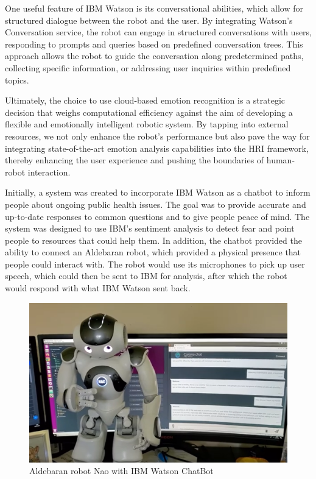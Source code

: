 One useful feature of IBM Watson is its conversational abilities, which allow for structured dialogue between the robot and the user. By integrating Watson's Conversation service, the robot can engage in structured conversations with users, responding to prompts and queries based on predefined conversation trees. This approach allows the robot to guide the conversation along predetermined paths, collecting specific information, or addressing user inquiries within predefined topics.

Ultimately, the choice to use cloud-based emotion recognition is a strategic decision that weighs computational efficiency against the aim of developing a flexible and emotionally intelligent robotic system. By tapping into external resources, we not only enhance the robot's performance but also pave the way for integrating state-of-the-art emotion analysis capabilities into the HRI framework, thereby enhancing the user experience and pushing the boundaries of human-robot interaction. \cite{Kumar2022-gd}

Initially, a system was created to incorporate IBM Watson as a chatbot to inform people about ongoing public health issues. The goal was to provide accurate and up-to-date responses to common questions and to give people peace of mind. The system was designed to use IBM’s sentiment analysis to detect fear and point people to resources that could help them. In addition, the chatbot provided the ability to connect an Aldebaran robot, which provided a physical presence that people could interact with. The robot would use its microphones to pick up user speech, which could then be sent to IBM for analysis, after which the robot would respond with what IBM Watson sent back.

\begin{figure}[!htb]
    \centering{}
    \includegraphics[scale=0.25]{aed_images/nao_with_chatbot.png}
    \caption{Aldebaran robot Nao with IBM Watson ChatBot}
    \label{figure:naochatbot}
\end{figure}

